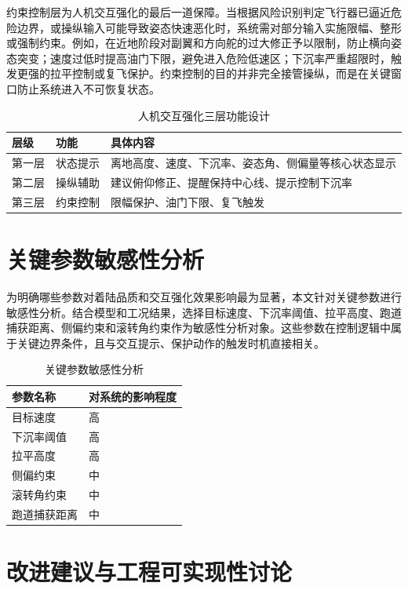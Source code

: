约束控制层为人机交互强化的最后一道保障。当根据风险识别判定飞行器已逼近危险边界，或操纵输入可能导致姿态快速恶化时，系统需对部分输入实施限幅、整形或强制约束。例如，在近地阶段对副翼和方向舵的过大修正予以限制，防止横向姿态突变；速度过低时提高油门下限，避免进入危险低速区；下沉率严重超限时，触发更强的拉平控制或复飞保护。约束控制的目的并非完全接管操纵，而是在关键窗口防止系统进入不可恢复状态。

\begin{table}[H]
\centering
\caption{人机交互强化三层功能设计}
\begin{tabular}{|l|l|l|}
\hline
\textbf{层级} & \textbf{功能} & \textbf{具体内容} \\
\hline
第一层 & 状态提示 & 离地高度、速度、下沉率、姿态角、侧偏量等核心状态显示 \\
\hline
第二层 & 操纵辅助 & 建议俯仰修正、提醒保持中心线、提示控制下沉率 \\
\hline
第三层 & 约束控制 & 限幅保护、油门下限、复飞触发 \\
\hline
\end{tabular}
\end{table}

\section{关键参数敏感性分析}

为明确哪些参数对着陆品质和交互强化效果影响最为显著，本文针对关键参数进行敏感性分析。结合模型和工况结果，选择目标速度、下沉率阈值、拉平高度、跑道捕获距离、侧偏约束和滚转角约束作为敏感性分析对象。这些参数在控制逻辑中属于关键边界条件，且与交互提示、保护动作的触发时机直接相关。

\begin{table}[H]
\centering
\caption{关键参数敏感性分析}
\begin{tabular}{|l|l|}
\hline
\textbf{参数名称} & \textbf{对系统的影响程度} \\
\hline
目标速度 & 高 \\
\hline
下沉率阈值 & 高 \\
\hline
拉平高度 & 高 \\
\hline
侧偏约束 & 中 \\
\hline
滚转角约束 & 中 \\
\hline
跑道捕获距离 & 中 \\
\hline
\end{tabular}
\end{table}

\section{改进建议与工程可实现性讨论}

